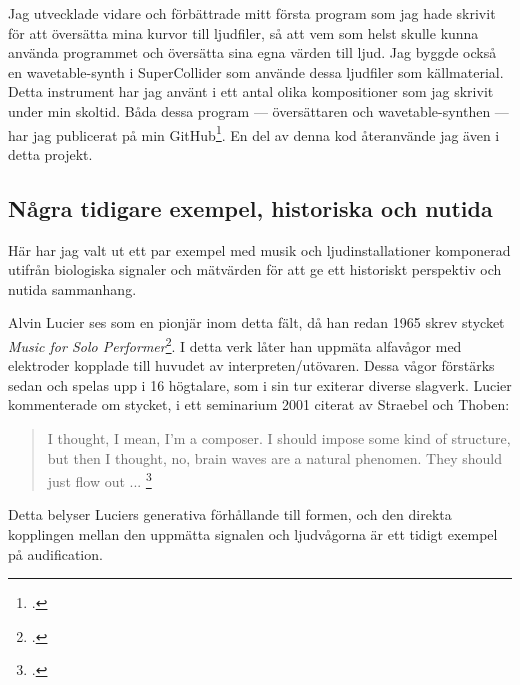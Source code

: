 \documentclass[11pt, a4paper]{article} %
\begin{document}
Jag utvecklade vidare och förbättrade mitt första program som jag hade skrivit för att översätta mina kurvor till ljudfiler, så att vem som helst skulle kunna använda programmet och översätta sina egna värden till ljud. Jag byggde också en wavetable-synth i SuperCollider som använde dessa ljudfiler som källmaterial. Detta instrument har jag använt i ett antal olika kompositioner som jag skrivit under min skoltid. Båda dessa program --- översättaren och wavetable-synthen --- har jag publicerat på min GitHub\footcite{jondell_kj-jondelldiabetes-synth_2021}. En del av denna kod återanvände jag även i detta projekt.

\subsection*{Några tidigare exempel, historiska och nutida}
Här har jag valt ut ett par exempel med musik och ljudinstallationer komponerad utifrån biologiska signaler och mätvärden för att ge ett historiskt perspektiv och nutida sammanhang.

Alvin Lucier ses som en pionjär inom detta fält, då han redan 1965 skrev stycket \emph{Music for Solo Performer}\footcite{lucier_music_1965}. I detta verk låter han uppmäta alfavågor med elektroder kopplade till huvudet av interpreten/utövaren. Dessa vågor förstärks sedan och spelas upp i 16 högtalare, som i sin tur exiterar diverse slagverk. Lucier kommenterade om stycket, i ett seminarium 2001 citerat av Straebel och Thoben:

\begin{quote}
  I thought,  I mean, I'm a composer. I should impose some kind of structure, but then I thought, no, brain waves are a natural phenomen. They should just flow out ... \footcite{straebel_alvin_2014}
\end{quote}

Detta belyser Luciers generativa förhållande till formen, och den direkta kopplingen mellan den uppmätta signalen och ljudvågorna är ett tidigt exempel på \gls{audification}.
\end{document}
